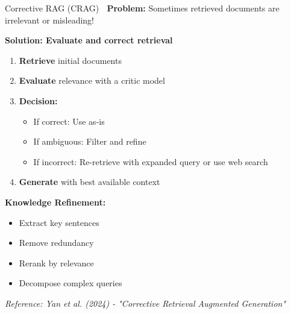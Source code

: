\documentclass[aspectratio=169]{beamer}
\begin{document}
\begin{frame}[shrink=10]{Corrective RAG (CRAG) 🔧}
\textbf{Problem:} Sometimes retrieved documents are irrelevant or misleading!

\vspace{0.5em}

\textbf{Solution: Evaluate and correct retrieval}

\begin{enumerate}\setlength{\itemsep}{0pt}
    \item \textbf{Retrieve} initial documents
    \item \textbf{Evaluate} relevance with a critic model
    \item \textbf{Decision:}
    \begin{itemize}\setlength{\itemsep}{0pt}
        \item If correct: Use as-is
        \item If ambiguous: Filter and refine
        \item If incorrect: Re-retrieve with expanded query or use web search
    \end{itemize}
    \item \textbf{Generate} with best available context
\end{enumerate}

\vspace{0.5em}

\textbf{Knowledge Refinement:}
\begin{itemize}\setlength{\itemsep}{0pt}
    \item Extract key sentences
    \item Remove redundancy
    \item Rerank by relevance
    \item Decompose complex queries
\end{itemize}

\vspace{0.5em}
\small
\textit{Reference: Yan et al. (2024) - "Corrective Retrieval Augmented Generation"}
\end{frame}
\end{document}
